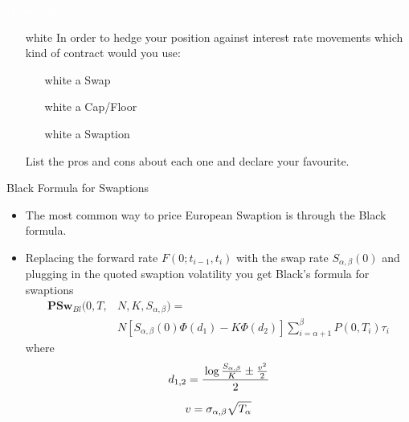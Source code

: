 \documentclass{beamer}
\begin{document}
\begin{homework}
\begin{frame}{\textcolor{white}{Homework}}
\begin{itemize}
\item[white] In order to hedge your position against interest rate movements which kind of contract would you use: 
\begin{itemize}
\item[white] a Swap
\item[white] a Cap/Floor
\item[white] a Swaption
\end{itemize}
List the pros and cons about each one and declare your favourite.
\end{itemize}
\end{frame}
\end{homework}

\begin{frame}{Black Formula for Swaptions}
\begin{itemize}
	\item The most common way to price European Swaption is through the Black formula.
	\item Replacing the forward rate $F(0;t_{i-1},t_i)$ with the swap rate $S_{\alpha,\beta}(0)$ and plugging in the quoted swaption volatility you get Black's formula for swaptions
	\begin{equation}
		\boxed{\begin{aligned}
			\textbf{PSw}_{Bl}(0,T,&N,K,S_{\alpha,\beta})=\\
			&N\left[S_{\alpha,\beta}(0)\Phi(d_1)-K\Phi(d_2)\right]\sum_{i=\alpha+1}^\beta P(0,T_i)\tau_i
		\end{aligned}}
	\end{equation}
	where
	\begin{equation*}
		\begin{gathered}
		d_{1,2} = \cfrac{\log{\frac{S_{\alpha,\beta}}{K}} \pm \frac{v^2}{2}}{2}\\[0.2cm] 
		v = \sigma_{\alpha,\beta}\sqrt{T_\alpha}
		\end{gathered}
	\end{equation*}
\end{itemize}
\end{frame}
\end{document}
